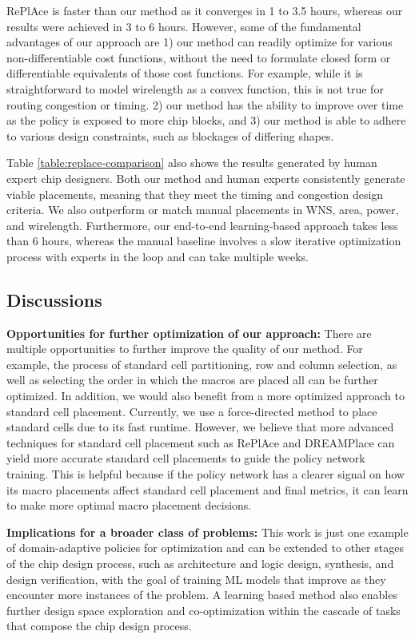 \documentclass{article}
\begin{document}
RePlAce is faster than our method as it converges in 1 to 3.5 hours, whereas our results were achieved in 3 to 6 hours. However, some of the fundamental advantages of our approach are 1) our method can readily optimize for various non-differentiable cost functions, without the need to formulate closed form or differentiable equivalents of those cost functions. For example, while it is straightforward to model wirelength as a convex function, this is not true for routing congestion or timing. 2) our method has the ability to improve over time as the policy is exposed to more chip blocks, and 3) our method is able to adhere to various design constraints, such as blockages of differing shapes.

Table \ref{table:replace-comparison} also shows the results generated by human expert chip designers. Both our method and human experts consistently generate viable placements, meaning that they meet the timing and congestion design criteria. We also outperform or match manual placements in WNS, area, power, and wirelength. Furthermore, our end-to-end learning-based approach takes less than 6 hours, whereas the manual baseline involves a slow iterative optimization process with experts in the loop and can take multiple weeks. 

\subsection{Discussions}

\textbf{Opportunities for further optimization of our approach:} There are multiple opportunities to further improve the quality of our method. For example, the process of standard cell partitioning, row and column selection, as well as selecting the order in which the macros are placed all can be further optimized. In addition, we would also benefit from a more optimized approach to standard cell placement. Currently, we use a force-directed method to place standard cells due to its fast runtime. However, we believe that more advanced techniques for standard cell placement such as RePlAce \cite{RePlAce19} and DREAMPlace \cite{Dreamplace19} can yield more accurate standard cell placements to guide the policy network training. This is helpful because if the policy network has a clearer signal on how its macro placements affect standard cell placement and final metrics, it can learn to make more optimal macro placement decisions.

\textbf{Implications for a broader class of problems:} This work is just one example of domain-adaptive policies for optimization and can be extended to other stages of the chip design process, such as architecture and logic design, synthesis, and design verification, with the goal of training ML models that improve as they encounter more instances of the problem. A learning based method also enables further design space exploration and co-optimization within the cascade of tasks that compose the chip design process. 
\end{document}
